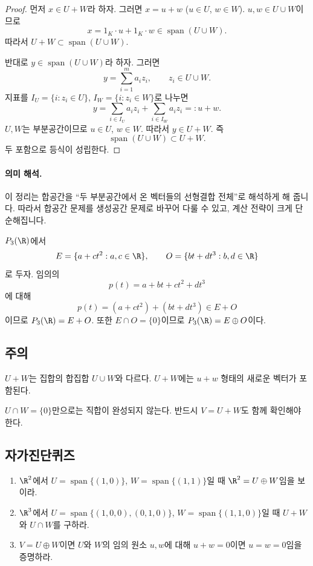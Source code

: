 \begin{proof}
먼저 $x\in U+W$라 하자. 그러면 $x=u+w$ ($u\in U$, $w\in W$). $u,w\in U\cup W$이므로
\[
x=1_K\cdot u+1_K\cdot w\in\operatorname{span}(U\cup W).
\]
따라서 $U+W\subset\operatorname{span}(U\cup W)$.

반대로 $y\in\operatorname{span}(U\cup W)$라 하자. 그러면
\[
y=\sum_{i=1}^m a_i z_i,\qquad z_i\in U\cup W.
\]
지표를 $I_U=\{i:z_i\in U\}$, $I_W=\{i:z_i\in W\}$로 나누면
\[
y=\sum_{i\in I_U}a_iz_i+\sum_{i\in I_W}a_iz_i=:u+w.
\]
$U,W$는 부분공간이므로 $u\in U$, $w\in W$. 따라서 $y\in U+W$. 즉
\[
\operatorname{span}(U\cup W)\subset U+W.
\]
두 포함으로 등식이 성립한다.
\end{proof}

\paragraph{의미 해석.}
이 정리는 합공간을 ``두 부분공간에서 온 벡터들의 선형결합 전체''로 해석하게 해 줍니다. 따라서 합공간 문제를 생성공간 문제로 바꾸어 다룰 수 있고, 계산 전략이 크게 단순해집니다.

\begin{example}
$P_3(\R)$에서
\[
E=\{a+ct^2:a,c\in\R\},\qquad O=\{bt+dt^3:b,d\in\R\}
\]
로 두자. 임의의
\[
p(t)=a+bt+ct^2+dt^3
\]
에 대해
\[
p(t)=(a+ct^2)+(bt+dt^3)\in E+O
\]
이므로 $P_3(\R)=E+O$. 또한 $E\cap O=\{0\}$이므로 $P_3(\R)=E\oplus O$이다.
\end{example}

\subsection*{주의}
\begin{warning}
$U+W$는 집합의 합집합 $U\cup W$와 다르다. $U+W$에는 $u+w$ 형태의 새로운 벡터가 포함된다.
\end{warning}
\begin{warning}
$U\cap W=\{0\}$만으로는 직합이 완성되지 않는다. 반드시 $V=U+W$도 함께 확인해야 한다.
\end{warning}

\subsection*{자가진단퀴즈}
\begin{enumerate}[label=\arabic*.]
\item $\R^2$에서 $U=\operatorname{span}\{(1,0)\}$, $W=\operatorname{span}\{(1,1)\}$일 때 $\R^2=U\oplus W$임을 보이라.
\item $\R^3$에서 $U=\operatorname{span}\{(1,0,0),(0,1,0)\}$, $W=\operatorname{span}\{(1,1,0)\}$일 때 $U+W$와 $U\cap W$를 구하라.
\item $V=U\oplus W$이면 $U$와 $W$의 임의 원소 $u,w$에 대해 $u+w=0$이면 $u=w=0$임을 증명하라.
\end{enumerate}

